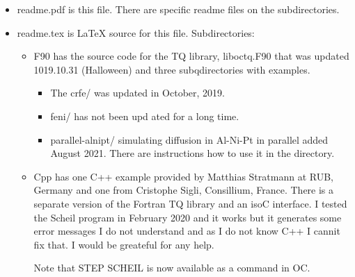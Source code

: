 \documentclass[12pt]{article}
\begin{document}
\begin{itemize}
\item readme.pdf is this file.  There are specific readme files on the
  subdirectories.

\item readme.tex is LaTeX source for this file.
  Subdirectories:
  \begin{itemize}
  \item F90 has the source code for the TQ library, liboctq.F90 that
    was updated 1019.10.31 (Halloween) and three subqdirectories with
    examples.
    \begin{itemize}
    \item The crfe/ was updated in October, 2019.
    \item feni/ has not been upd
      ated for a long time.
    \item parallel-alnipt/ simulating diffusion in Al-Ni-Pt in
      parallel added August 2021.  There are instructions how to use
      it in the directory.
    \end{itemize}

  \item Cpp has one C++ example provided by Matthias Stratmann at RUB,
    Germany and one from Cristophe Sigli, Consillium, France.  There
    is a separate version of the Fortran TQ library and an isoC
    interface.  I tested the Scheil program in February 2020 and it works
    but it generates some error messages I do not understand and as I
    do not know C++ I cannit fix that.  I would be greateful for any help.

    Note that STEP SCHEIL is now available as a command in OC.

  \end{itemize}
\end{itemize}
\end{document}
